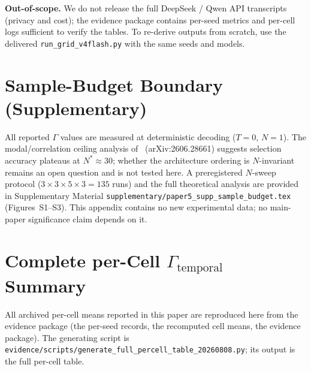 \documentclass[11pt]{article}
\begin{document}
\noindent\textbf{Out-of-scope.}
We do not release the full DeepSeek / Qwen API transcripts (privacy and cost); the evidence package contains per-seed metrics and per-cell logs sufficient to verify the tables. To re-derive outputs from scratch, use the delivered \texttt{run\_grid\_v4flash.py} with the same seeds and models.


\appendix
\section{Sample-Budget Boundary (Supplementary)}
\label{sec:supp-sample-budget}

All reported $\Gamma$ values are measured at deterministic decoding ($T{=}0$, $N{=}1$). The modal/correlation ceiling analysis of~\cite{bay2026sampling} (arXiv:2606.28661) suggests selection accuracy plateaus at $N^*{\approx}30$; whether the architecture ordering is $N$-invariant remains an open question and is not tested here. A preregistered $N$-sweep protocol ($3{\times}3{\times}5{\times}3{=}135$ runs) and the full theoretical analysis are provided in Supplementary Material \texttt{supplementary/paper5\_supp\_sample\_budget.tex} (Figures~S1--S3). This appendix contains no new experimental data; no main-paper significance claim depends on it.





\section{Complete per-Cell $\Gamma_{\text{temporal}}$ Summary}
\label{sec:supp-full-percell}
All archived per-cell means reported in this paper are reproduced here from the evidence package (the per-seed records, the recomputed cell means, the evidence package). The generating script is \texttt{evidence/scripts/generate\_full\_percell\_table\_20260808.py}; its output is the full per-cell table.
\end{document}
